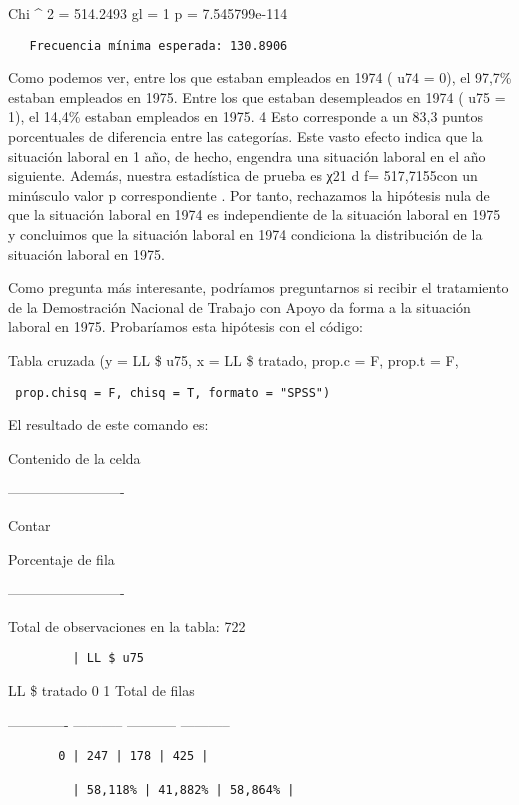\documentclass[
]{book}
\begin{document}
Chi \^{} 2 = 514.2493 gl = 1 p = 7.545799e-114

\begin{verbatim}
   Frecuencia mínima esperada: 130.8906
\end{verbatim}

Como podemos ver, entre los que estaban empleados en 1974 ( u74 = 0), el 97,7\% estaban empleados en 1975. Entre los que estaban desempleados en 1974 ( u75 = 1), el 14,4\% estaban empleados en 1975. 4 Esto corresponde a un 83,3 puntos porcentuales de diferencia entre las categorías. Este vasto efecto indica que la situación laboral en 1 año, de hecho, engendra una situación laboral en el año siguiente. Además, nuestra estadística de prueba es χ21 d f= 517,7155con un minúsculo valor p correspondiente . Por tanto, rechazamos la hipótesis nula de que la situación laboral en 1974 es independiente de la situación laboral en 1975 y concluimos que la situación laboral en 1974 condiciona la distribución de la situación laboral en 1975.

Como pregunta más interesante, podríamos preguntarnos si recibir el tratamiento de la Demostración Nacional de Trabajo con Apoyo da forma a la situación laboral en 1975. Probaríamos esta hipótesis con el código:

Tabla cruzada (y = LL \$ u75, x = LL \$ tratado, prop.c = F, prop.t = F,

\begin{verbatim}
 prop.chisq = F, chisq = T, formato = "SPSS")
\end{verbatim}

El resultado de este comando es:

Contenido de la celda

------------------------- \textbar{}

Contar \textbar{}

Porcentaje de fila \textbar{}

------------------------- \textbar{}

Total de observaciones en la tabla: 722

\begin{verbatim}
         | LL $ u75
\end{verbatim}

LL \$ tratado \textbar{} 0 \textbar{} 1 \textbar{} Total de filas \textbar{}

------------- \textbar{} ----------- \textbar{} ----------- \textbar{} ----------- \textbar{}

\begin{verbatim}
       0 | 247 | 178 | 425 |

         | 58,118% | 41,882% | 58,864% |
\end{verbatim}
\end{document}
